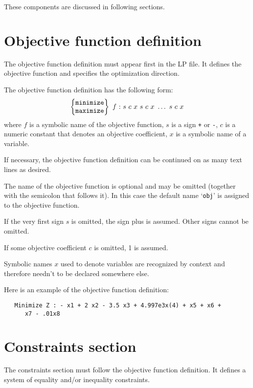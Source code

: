\vspace*{-8pt}

These components are discussed in following sections.

\section{Objective function definition}

The objective function definition must appear first in the LP file.
It defines the objective function and specifies the optimization
direction.

The objective function definition has the following form:
$$
\left\{
\begin{array}{@{}c@{}}
{\tt minimize} \\ {\tt maximize}
\end{array}
\right\}\ f\ {\tt :}\ s\ c\ x\ s\ c\ x\ \dots\ s\ c\ x
$$
where $f$ is a symbolic name of the objective function, $s$ is a sign
\verb|+| or \verb|-|, $c$ is a numeric constant that denotes an
objective coefficient, $x$ is a symbolic name of a variable.

If necessary, the objective function definition can be continued on as
many text lines as desired.

The name of the objective function is optional and may be omitted
(together with the semicolon that follows it). In this case the default
name `\verb|obj|' is assigned to the objective function.

If the very first sign $s$ is omitted, the sign plus is assumed. Other
signs cannot be omitted.

If some objective coefficient $c$ is omitted, 1 is assumed.

Symbolic names $x$ used to denote variables are recognized by context
and therefore needn't to be declared somewhere else.

Here is an example of the objective function definition:

\begin{verbatim}
   Minimize Z : - x1 + 2 x2 - 3.5 x3 + 4.997e3x(4) + x5 + x6 +
      x7 - .01x8
\end{verbatim}

\section{Constraints section}

The constraints section must follow the objective function definition.
It defines a system of equality and/or inequality constraints.

